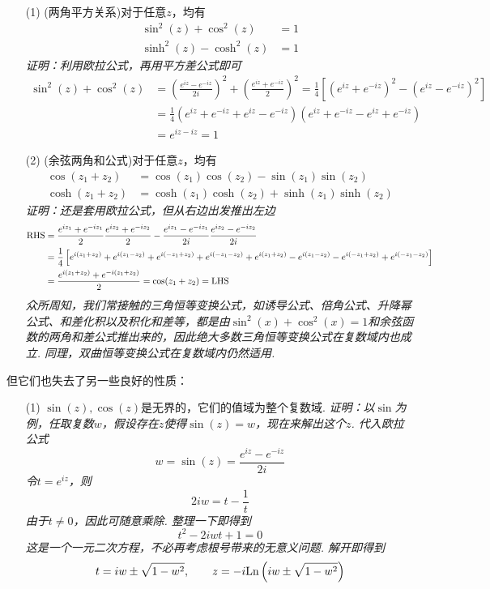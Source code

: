 \documentclass[main.tex]{subfiles}
\begin{document}
\begin{itemize}
    \item [(1)] (两角平方关系)对于任意\(z\)，均有
    \begin{align*}
        \sin^2(z) + \cos^2(z) &= 1 \\
        \sinh^2(z) - \cosh^2(z) &= 1
    \end{align*}
    \textit{
        证明：利用欧拉公式，再用平方差公式即可
    }
    \begin{align*}
        \sin^2(z)+\cos^2(z) &= \left(\frac{e^{iz}-e^{-iz}}{2i}\right)^2+\left(\frac{e^{iz}+e^{-iz}}{2}\right)^2 = \frac{1}{4}\left[(e^{iz}+e^{-iz})^2-(e^{iz}-e^{-iz})^2\right] \\
        &= \frac{1}{4}(e^{iz}+e^{-iz}+e^{iz}-e^{-iz})(e^{iz}+e^{-iz}-e^{iz}+e^{-iz}) \\
        &= e^{iz-iz}=1
    \end{align*}
    \item [(2)] (余弦两角和公式)对于任意\(z\)，均有
    \begin{align*}
        \cos(z_1+z_2) &= \cos(z_1)\cos(z_2)-\sin(z_1)\sin(z_2) \\
        \cosh(z_1+z_2) &= \cosh(z_1)\cosh(z_2)+\sinh(z_1)\sinh(z_2)
    \end{align*}
    \textit{
        证明：还是套用欧拉公式，但从右边出发推出左边
    }
    \begin{align*}
        \textrm{RHS} &= \frac{e^{iz_1}+e^{-iz_1}}{2}\frac{e^{iz_2}+e^{-iz_2}}{2} - \frac{e^{iz_1}-e^{-iz_1}}{2i}\frac{e^{iz_2}-e^{-iz_2}}{2i} \\
        &= \frac{1}{4}\left[e^{i(z_1+z_2)}+e^{i(z_1-z_2)}+e^{i(-z_1+z_2)}+e^{i(-z_1-z_2)}+e^{i(z_1+z_2)}-e^{i(z_1-z_2)}-e^{i(-z_1+z_2)}+e^{i(-z_1-z_2)}\right] \\
        &= \frac{e^{i(z_1+z_2)}+e^{-i(z_1+z_2)}}{2} = \cos(z_1+z_2) = {\rm LHS}
    \end{align*}
    \textit{
        众所周知，我们常接触的三角恒等变换公式，如诱导公式、倍角公式、升降幂公式、和差化积以及积化和差等，都是由\(\sin^2(x)+\cos^2(x)=1\)和余弦函数的两角和差公式推出来的，因此绝大多数三角恒等变换公式在复数域内也成立. 同理，双曲恒等变换公式在复数域内仍然适用.
    }
\end{itemize}
但它们也失去了另一些良好的性质：
\begin{itemize}
    \item [(1)] \(\sin(z),\cos(z)\)是无界的，它们的值域为整个复数域.
    \newline
    \textit{
        证明：以\(\sin\)为例，任取复数\(w\)，假设存在\(z\)使得\(\sin(z)=w\)，现在来解出这个\(z\). 代入欧拉公式
        \[w=\sin(z)=\frac{e^{iz}-e^{-iz}}{2i}\]
        令\(t=e^{iz}\)，则
        \[2iw=t-\frac{1}{t}\]
        由于\(t\neq 0\)，因此可随意乘除. 整理一下即得到
        \[t^2-2iwt+1=0\]
        这是一个一元二次方程，不必再考虑根号带来的无意义问题. 解开即得到
        \[t=iw \pm \sqrt{1-w^2}, \qquad z=-i{\rm Ln}\left(iw \pm \sqrt{1-w^2}\right)\]
    }
\end{itemize}
\end{document}
